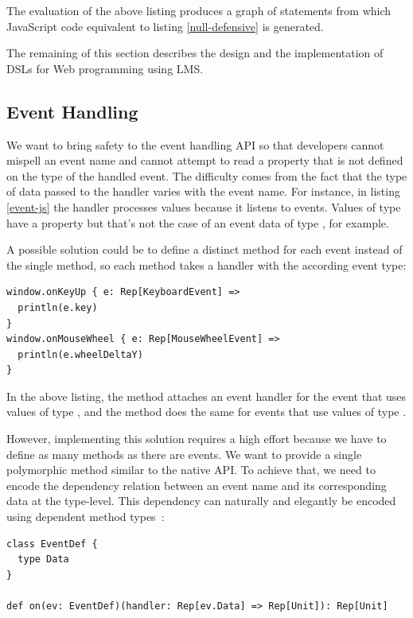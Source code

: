 \documentclass[american,english,runningheads]{llncs}
\begin{document}
The evaluation of the above listing produces a graph of statements from which JavaScript code equivalent to
listing \ref{null-defensive} is generated.

The remaining of this section describes the design and the implementation of DSLs for Web programming using LMS.

\subsection{Event Handling}

We want to bring safety to the event handling API so that developers cannot mispell an event name and cannot attempt
to read a property that is not defined on the type of the handled event. The difficulty comes from the fact that the
type of data passed to the handler varies with the event name. For instance, in listing \ref{event-js} the
handler processes  values because it listens to  events. Values of type
 have a property  but that’s not the case of an event data of type
, for example.

A possible solution could be to define a distinct method for each event instead of the single 
method, so each method takes a handler with the according event type:

\begin{lstlisting}
window.onKeyUp { e: Rep[KeyboardEvent] =>
  println(e.key)
}
window.onMouseWheel { e: Rep[MouseWheelEvent] =>
  println(e.wheelDeltaY)
}
\end{lstlisting}

In the above listing, the  method attaches an event handler for the  event that uses values
of type , and the  method does the same for  events that use
values of type .

However, implementing this solution requires a high effort because we have to define as many methods as there are
events. We want to provide a single polymorphic method similar to the native API. To achieve that, we need to encode
the dependency relation between an event name and its corresponding data at the type-level. This dependency can
naturally and elegantly be encoded using dependent method types~\cite{Oliveira10_Typeclasses}:

\begin{lstlisting}
class EventDef {
  type Data
}

def on(ev: EventDef)(handler: Rep[ev.Data] => Rep[Unit]): Rep[Unit]
\end{lstlisting}
\end{document}
